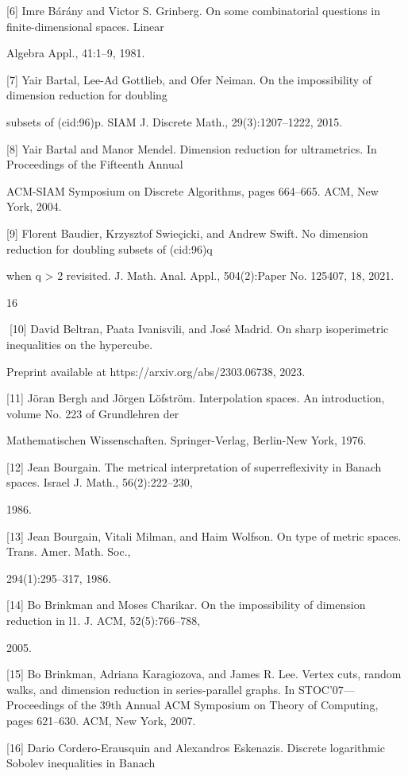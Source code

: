 {[6] Imre Bárány and Victor S. Grinberg. On some combinatorial questions in ﬁnite-dimensional spaces. Linear

Algebra Appl., 41:1–9, 1981.

[7] Yair Bartal, Lee-Ad Gottlieb, and Ofer Neiman. On the impossibility of dimension reduction for doubling

subsets of (cid:96)p. SIAM J. Discrete Math., 29(3):1207–1222, 2015.

[8] Yair Bartal and Manor Mendel. Dimension reduction for ultrametrics. In Proceedings of the Fifteenth Annual

ACM-SIAM Symposium on Discrete Algorithms, pages 664–665. ACM, New York, 2004.

[9] Florent Baudier, Krzysztof Swieçicki, and Andrew Swift. No dimension reduction for doubling subsets of (cid:96)q

when q > 2 revisited. J. Math. Anal. Appl., 504(2):Paper No. 125407, 18, 2021.

16

[10] David Beltran, Paata Ivanisvili, and José Madrid. On sharp isoperimetric inequalities on the hypercube.

Preprint available at https://arxiv.org/abs/2303.06738, 2023.

[11] Jöran Bergh and Jörgen Löfström. Interpolation spaces. An introduction, volume No. 223 of Grundlehren der

Mathematischen Wissenschaften. Springer-Verlag, Berlin-New York, 1976.

[12] Jean Bourgain. The metrical interpretation of superreﬂexivity in Banach spaces. Israel J. Math., 56(2):222–230,

1986.

[13] Jean Bourgain, Vitali Milman, and Haim Wolfson. On type of metric spaces. Trans. Amer. Math. Soc.,

294(1):295–317, 1986.

[14] Bo Brinkman and Moses Charikar. On the impossibility of dimension reduction in l1. J. ACM, 52(5):766–788,

2005.

[15] Bo Brinkman, Adriana Karagiozova, and James R. Lee. Vertex cuts, random walks, and dimension reduction in
series-parallel graphs. In STOC’07—Proceedings of the 39th Annual ACM Symposium on Theory of Computing,
pages 621–630. ACM, New York, 2007.

[16] Dario Cordero-Erausquin and Alexandros Eskenazis. Discrete logarithmic Sobolev inequalities in Banach

}
